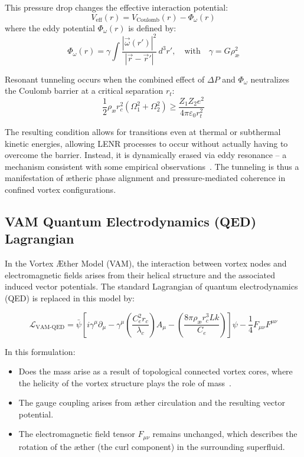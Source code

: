 This pressure drop changes the effective interaction potential:
\begin{equation}
    V_\text{eff}(r) = V_\text{Coulomb}(r) - \Phi_\omega(r)
\end{equation}
where the eddy potential \( \Phi_\omega(r) \) is defined by:
\begin{equation}
    \Phi_\omega(r) = \gamma \int \frac{|\vec{\omega}(r')|^2}{|\vec{r} - \vec{r}'|} \, d^3r',
    \quad \text{with} \quad
    \gamma = G \rho_\text{\ae}^2
\end{equation}

Resonant tunneling occurs when the combined effect of \( \Delta P \) and \( \Phi_\omega \) neutralizes the Coulomb barrier at a critical separation \( r_t \):
\begin{equation}
    \frac{1}{2} \rho_\text{\ae} r_c^2 (\Omega_1^2 + \Omega_2^2) \geq \frac{Z_1 Z_2 e^2}{4\pi \varepsilon_0 r_t^2}
\end{equation}

The resulting condition allows for transitions even at thermal or subthermal kinetic energies, allowing LENR processes to occur without actually having to overcome the barrier. Instead, it is dynamically erased via eddy resonance – a mechanism consistent with some empirical observations~\cite{Storms2021}. The tunneling is thus a manifestation of ætheric phase alignment and pressure-mediated coherence in confined vortex configurations.

\subsection*{VAM Quantum Electrodynamics (QED) Lagrangian}

In the Vortex Æther Model (VAM), the interaction between vortex nodes and electromagnetic fields arises from their helical structure and the associated induced vector potentials. The standard Lagrangian of quantum electrodynamics (QED) is replaced in this model by:

\begin{equation}
    \mathcal{L}_\text{VAM-QED} =
    \bar{\psi} \left[ i \gamma^\mu \partial_\mu
                   - \gamma^\mu \left( \frac{C_e^2 r_c}{\lambda_c} \right) A_\mu
                   - \left( \frac{8\pi \rho_\text{\ae} r_c^3 Lk}{C_e} \right) \right] \psi
    - \frac{1}{4} F_{\mu\nu} F^{\mu\nu}
\end{equation}

In this formulation:

\begin{itemize}
    \item Does the mass arise as a result of topological connected vortex cores, where the helicity of the vortex structure plays the role of mass~\cite{Volovik2003}.
    \item The gauge coupling arises from æther circulation and the resulting vector potential.
    \item The electromagnetic field tensor \( F_{\mu\nu} \) remains unchanged, which describes the rotation of the æther (the curl component) in the surrounding superfluid.
\end{itemize}

